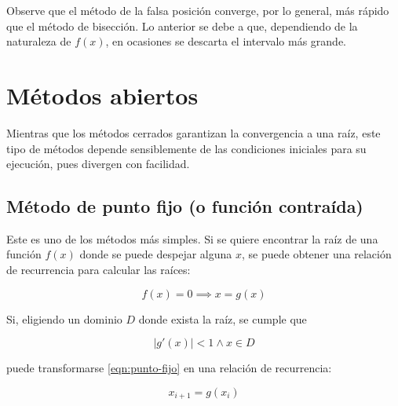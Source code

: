 Observe que el método de la falsa posición converge, por lo general, más rápido
que el método de bisección. Lo anterior se debe a que, dependiendo de la
naturaleza de $f(x)$, en ocasiones se descarta el intervalo más grande.


\section{Métodos abiertos}

Mientras que los métodos cerrados garantizan la convergencia a una raíz, este
tipo de métodos depende sensiblemente de las condiciones iniciales para su
ejecución, pues divergen con facilidad.

\subsection{Método de punto fijo (o función contraída)}

Este es uno de los métodos más simples. Si se quiere encontrar la raíz de una
función $f(x)$ donde se puede despejar alguna $x$, se puede obtener una
relación de recurrencia para calcular las raíces:

\begin{equation}\label{eqn:punto-fijo}
    f(x) = 0 \implies \boxed{x = g(x)}
\end{equation}

Si, eligiendo un dominio $D$ donde exista la raíz, se cumple que

\[
    \left| g'(x) \right| < 1 \land x \in D
\]

puede transformarse \ref{eqn:punto-fijo} en una relación de recurrencia:

\begin{equation} \label{eqn:recurrencia-punto-fijo}
    \boxed{x_{i+1} = g(x_i)}
\end{equation}

